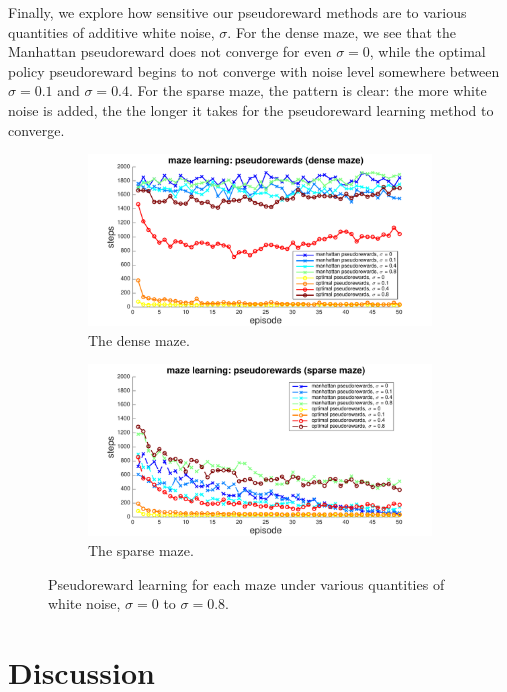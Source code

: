 \documentclass[notitlepage]{article}
\begin{document}
Finally, we explore how sensitive our pseudoreward methods are to various quantities of additive white noise, $\sigma$. For the dense maze, we see that the Manhattan pseudoreward does not converge for even $\sigma = 0$, while the optimal policy pseudoreward begins to not converge with noise level somewhere between $\sigma = 0.1$ and $\sigma = 0.4$. For the sparse maze, the pattern is clear: the more white noise is added, the the longer it takes for the pseudoreward learning method to converge.

\begin{figure}
\centering
\begin{subfigure}{.45\textwidth}
  \centering
  \includegraphics[width=\linewidth]{PRdenseCompare}
  \caption{The dense maze.}
\end{subfigure}
\begin{subfigure}{.45\textwidth}
  \centering
  \includegraphics[width=\linewidth]{PRsparseCompare}
  \caption{The sparse maze.}
\end{subfigure}
\caption{Pseudoreward learning for each maze under various quantities of white noise, $\sigma = 0$ to $\sigma = 0.8$.}
\label{fig:sigma-compare}
\end{figure}

\section*{Discussion}
\end{document}
